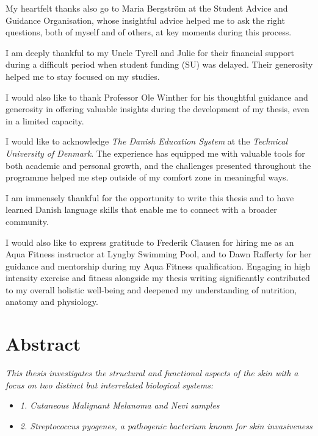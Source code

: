 \documentclass[
]{article}
\begin{document}
My heartfelt thanks also go to Maria Bergström at the Student Advice and
Guidance Organisation, whose insightful advice helped me to ask the
right questions, both of myself and of others, at key moments during
this process.

I am deeply thankful to my Uncle Tyrell and Julie for their financial
support during a difficult period when student funding (SU) was delayed.
Their generosity helped me to stay focused on my studies.

I would also like to thank Professor Ole Winther for his thoughtful
guidance and generosity in offering valuable insights during the
development of my thesis, even in a limited capacity.

I would like to acknowledge \emph{The Danish Education System} at the
\emph{Technical University of Denmark}. The experience has equipped me
with valuable tools for both academic and personal growth, and the
challenges presented throughout the programme helped me step outside of
my comfort zone in meaningful ways.

I am immensely thankful for the opportunity to write this thesis and to
have learned Danish language skills that enable me to connect with a
broader community.

I would also like to express gratitude to Frederik Clausen for hiring me
as an Aqua Fitness instructor at Lyngby Swimming Pool, and to Dawn
Rafferty for her guidance and mentorship during my Aqua Fitness
qualification. Engaging in high intensity exercise and fitness alongside
my thesis writing significantly contributed to my overall holistic
well-being and deepened my understanding of nutrition, anatomy and
physiology.

\newpage

\listoftables

\listoffigures

\newpage

\newpage
\setcounter{tocdepth}{3}
\tableofcontents

\newpage

\section{Abstract}\label{abstract}

\emph{This thesis investigates the structural and functional aspects of
the skin with a focus on two distinct but interrelated biological
systems:}

\begin{itemize}
\item
  \emph{1. Cutaneous Malignant Melanoma and Nevi samples}
\item
  \emph{2. Streptococcus pyogenes, a pathogenic bacterium known for skin
  invasiveness}
\end{itemize}
\end{document}
